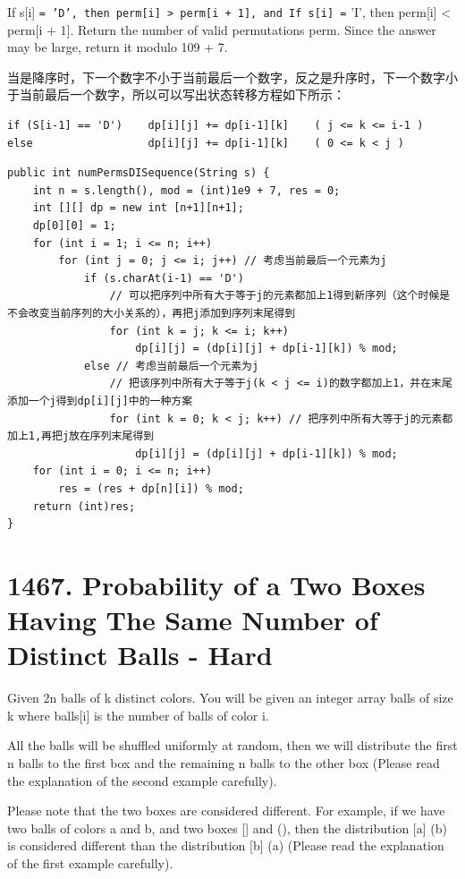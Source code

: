 \documentclass[9pt, b5paaper]{book}
\begin{document}
If s[i] \texttt{= 'D', then perm[i] > perm[i + 1], and
If s[i] =} 'I', then perm[i] < perm[i + 1].
Return the number of valid permutations perm. Since the answer may be large, return it modulo 109 + 7.

当是降序时，下一个数字不小于当前最后一个数字，反之是升序时，下一个数字小于当前最后一个数字，所以可以写出状态转移方程如下所示：
\begin{verbatim}
if (S[i-1] == 'D')    dp[i][j] += dp[i-1][k]    ( j <= k <= i-1 )
else                  dp[i][j] += dp[i-1][k]    ( 0 <= k < j )
\end{verbatim}
\begin{verbatim}
public int numPermsDISequence(String s) {
    int n = s.length(), mod = (int)1e9 + 7, res = 0;
    int [][] dp = new int [n+1][n+1];
    dp[0][0] = 1;
    for (int i = 1; i <= n; i++) 
        for (int j = 0; j <= i; j++) // 考虑当前最后一个元素为j
            if (s.charAt(i-1) == 'D')
                // 可以把序列中所有大于等于j的元素都加上1得到新序列（这个时候是不会改变当前序列的大小关系的），再把j添加到序列末尾得到
                for (int k = j; k <= i; k++) 
                    dp[i][j] = (dp[i][j] + dp[i-1][k]) % mod;
            else // 考虑当前最后一个元素为j
                // 把该序列中所有大于等于j(k < j <= i)的数字都加上1，并在末尾添加一个j得到dp[i][j]中的一种方案
                for (int k = 0; k < j; k++) // 把序列中所有大等于j的元素都加上1,再把j放在序列末尾得到
                    dp[i][j] = (dp[i][j] + dp[i-1][k]) % mod;
    for (int i = 0; i <= n; i++) 
        res = (res + dp[n][i]) % mod;
    return (int)res;
}
\end{verbatim}

\section{1467. Probability of a Two Boxes Having The Same Number of Distinct Balls - Hard}
\label{sec-16-2}
Given 2n balls of k distinct colors. You will be given an integer array balls of size k where balls[i] is the number of balls of color i. 

All the balls will be shuffled uniformly at random, then we will distribute the first n balls to the first box and the remaining n balls to the other box (Please read the explanation of the second example carefully).

Please note that the two boxes are considered different. For example, if we have two balls of colors a and b, and two boxes [] and (), then the distribution [a] (b) is considered different than the distribution [b] (a) (Please read the explanation of the first example carefully).
\end{document}
